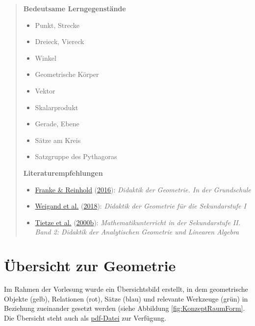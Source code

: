 \documentclass[
  ngerman,
]{scrbook}
\providecommand{\tightlist}{%
  \setlength{\itemsep}{0pt}\setlength{\parskip}{0pt}}
\theoremstyle{definition}
\theoremstyle{definition}
\theoremstyle{definition}
\theoremstyle{definition}
\theoremstyle{remark}
\begin{document}
\begin{quote}
\textbf{Bedeutsame Lerngegenstände}

\begin{itemize}
\tightlist
\item
  Punkt, Strecke
\item
  Dreieck, Viereck
\item
  Winkel
\item
  Geometrische Körper
\item
  Vektor
\item
  Skalarprodukt
\item
  Gerade, Ebene
\item
  Sätze am Kreis
\item
  Satzgruppe des Pythagoras
\end{itemize}

\textbf{Literaturempfehlungen}

\begin{itemize}
\tightlist
\item
  \protect\hyperlink{ref-Franke2016}{Franke \& Reinhold} (\protect\hyperlink{ref-Franke2016}{2016}): \emph{Didaktik der Geometrie. In der Grundschule}
\item
  \protect\hyperlink{ref-Weigand2018}{Weigand et al.} (\protect\hyperlink{ref-Weigand2018}{2018}): \emph{Didaktik der Geometrie für die Sekundarstufe I}
\item
  \protect\hyperlink{ref-Tietze:2000}{Tietze et al.} (\protect\hyperlink{ref-Tietze:2000}{2000b}): \emph{Mathematikunterricht in der Sekundarstufe II. Band 2: Didaktik der Analytischen Geometrie und Linearen Algebra}
\end{itemize}
\end{quote}

\hypertarget{uxfcbersicht-zur-geometrie}{%
\section{Übersicht zur Geometrie}\label{uxfcbersicht-zur-geometrie}}

Im Rahmen der Vorlesung wurde ein Übersichtsbild erstellt, in dem geometrische Objekte (gelb), Relationen (rot), Sätze (blau) und relevante Werkzeuge (grün) in Beziehung zueinander gesetzt werden (siehe Abbildung \ref{fig:KonzeptRaumForm}. Die Übersicht steht auch als \href{files/Stoffdidaktik-WiSe2122-AnhangR-KonzeptRaumForm.pdf}{pdf-Datei} zur Verfügung.
\end{document}
